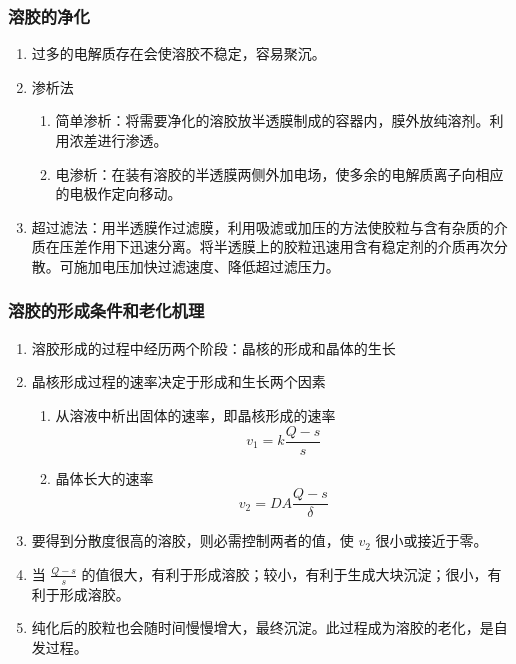 \subsubsection{溶胶的净化}

\begin{enumerate}
    \item 过多的电解质存在会使溶胶不稳定，容易聚沉。
    \item 渗析法
    \begin{enumerate}
        \item 简单渗析：将需要净化的溶胶放半透膜制成的容器内，膜外放纯溶剂。利用浓差进行渗透。
        \item 电渗析：在装有溶胶的半透膜两侧外加电场，使多余的电解质离子向相应的电极作定向移动。
    \end{enumerate}
    \item 超过滤法：用半透膜作过滤膜，利用吸滤或加压的方法使胶粒与含有杂质的介质在压差作用下迅速分离。将半透膜上的胶粒迅速用含有稳定剂的介质再次分散。可施加电压加快过滤速度、降低超过滤压力。
\end{enumerate}

\subsubsection{溶胶的形成条件和老化机理}

\begin{enumerate}
    \item 溶胶形成的过程中经历两个阶段：晶核的形成和晶体的生长
    \item 晶核形成过程的速率决定于形成和生长两个因素
    \begin{enumerate}
        \item 从溶液中析出固体的速率，即晶核形成的速率
        \begin{equation}
            v_1 = k \frac{Q - s}{s}
        \end{equation}
        \item 晶体长大的速率
        \begin{equation}
            v_2 = D A \frac{Q - s}{\delta}
        \end{equation}
    \end{enumerate}
    \item 要得到分散度很高的溶胶，则必需控制两者的值，使 $v_2$ 很小或接近于零。
    \item 当 $\frac{Q - s}{s}$ 的值很大，有利于形成溶胶；较小，有利于生成大块沉淀；很小，有利于形成溶胶。
    \item 纯化后的胶粒也会随时间慢慢增大，最终沉淀。此过程成为溶胶的老化，是自发过程。
\end{enumerate}

